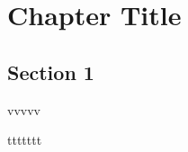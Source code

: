 \chapter{Chapter Title}
\label{ch:LR}
\section{Section 1}

\begin{definition}
vvvvv
\end{definition}

\begin{definition}
ttttttt
\end{definition}